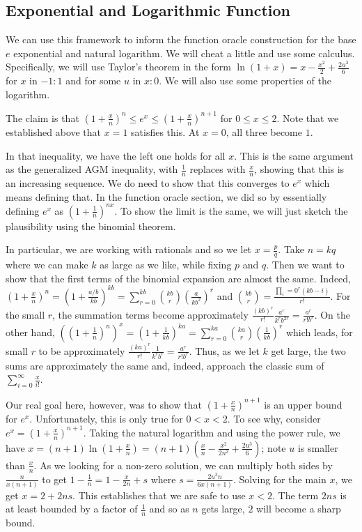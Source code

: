 \documentclass[12pt]{article}
\theoremstyle{remark}
\begin{document}
\subsection{Exponential and Logarithmic Function}

We can use this framework to inform the function oracle construction for the base $e$ exponential and natural logarithm. We will cheat a little and use some calculus. Specifically, we will use Taylor's theorem in the form $\ln(1+x) = x - \frac{x^2}{2} + \frac{2u^3}{6}$ for $x$ in $-1:1$ and for some $u$ in $x:0$. We will also use some properties of the logarithm. 

The claim is that $(1+\frac{x}{n})^n \leq e^x \leq (1+\frac{x}{n})^{n+1}$ for $0 \leq x \leq 2$. Note that we established above that $x=1$ satisfies this. At $x=0$, all three become $1$. 

In that inequality, we have the left one holds for all $x$. This is the same argument as the generalized AGM inequality, with $\frac{1}{n}$ replaces with $\frac{x}{n}$, showing that this is an increasing sequence. We do need to show that this converges to $e^x$ which means defining that. In the function oracle section, we did so by essentially defining $e^x$ as $(1+\frac{1}{n})^{nx}$. To show the limit is the same, we will just sketch the plausibility using the binomial theorem. 

In particular, we are working with rationals and so we let $x=\frac{p}{q}$. Take $n = kq$ where we can make $k$ as large as we like, while fixing $p$ and $q$. Then we want to show that the first terms of the binomial expansion are almost the same. Indeed, $(1+\frac{x}{n})^n = (1+ \frac{a/b}{kb})^{kb} = \sum_{r=0}^{kb} \binom{kb}{r} (\frac{a}{kb^2})^r$ and $\binom{kb}{r} = \frac{\prod_i=0^r (kb-i)}{r!}$. For the small $r$, the summation terms become approximately $\frac{(kb)^r}{r!} \frac{a^r}{k^rb^{2r}} = \frac{a^r}{r! b^r}$.  On the other hand, $((1+\frac{1}{n})^{n})^x = (1+ \frac{1}{kb})^{ka} = \sum_{r=0}^{ka} \binom{ka}{r} (\frac{1}{kb})^r$ which leads, for small $r$ to  be approximately $\frac{(ka)^r}{r!} \frac{1}{k^r b^r} = \frac{a^r}{r! b^r}$. Thus, as we let $k$ get large, the two sums are approximately the same and, indeed, approach the classic sum of $\sum_{i=0}^\infty \frac{x}{i!}$.

Our real goal here, however, was to show that $(1 + \frac{x}{n})^{n+1}$ is an upper bound for $e^x$. Unfortunately, this is only true for $0 < x < 2$. To see why, consider $e^x = (1+\frac{x}{n})^{n+1}$. Taking the natural logarithm and using the power rule, we have $x = (n+1) \ln (1 + \frac{x}{n} ) = (n+1) (\frac{x}{n} - \frac{x^2}{2n^2} + \frac{2u^3}{6})$; note $u$ is smaller than $\frac{x}{n}$. As we looking for a non-zero solution, we can multiply both sides by $\frac{n}{x (n+1)}$ to get $1- \frac{1}{n} = 1 - \frac{x}{2n} + s$ where $s = \frac{2u^3 n}{6 x (n+1)}$. Solving for the main $x$, we get $x = 2 + 2n s$. This establishes that we are safe to use $x < 2$. The term $2n s$ is at least bounded by a factor of $\frac{1}{n}$ and so as $n$ gets large, $2$ will become a sharp bound.  
\end{document}
